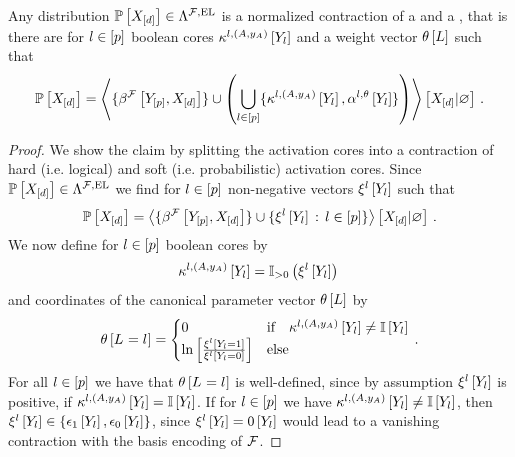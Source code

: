 \begin{theorem}
    \label{the:hybridNetworkRepresentation}
    Any distribution $\mathbb{P}\left[X_{[d]}\right]\in\Lambda^{\mathcal{F},\mathrm{EL}}$ is a normalized contraction of a \HardLogicNetwork{} and a \MarkovLogicNetwork{}, that is there are for $l\in[p]$ boolean cores $\kappa^{l,(A,y_{A})}\left[Y_{l}\right]$ and a weight vector $\theta\left[L\right]$ such that
    \begin{align*}
        \mathbb{P}\left[X_{[d]}\right] =
        \left\langle 
            \{\beta^{\mathcal{F}}\left[Y_{[p]},X_{[d]}\right]\}
            \cup \left(\bigcup_{l\in[p]}\{\kappa^{l,(A,y_{A})}\left[Y_{l}\right],\alpha^{l,\theta}\left[Y_{l}\right]\}\right)
        \right\rangle \left[ X_{[d]} | \varnothing \right] \, .
    \end{align*}
\end{theorem}
\begin{proof}
    We show the claim by splitting the activation cores into a contraction of hard (i.e. logical) and soft (i.e. probabilistic) activation cores.
    Since $\mathbb{P}\left[X_{[d]}\right]\in\Lambda^{\mathcal{F},\mathrm{EL}}$ we find for $l\in[p]$ non-negative vectors $\xi^{l}\left[Y_{l}\right]$ such that
    \begin{align*}
        \mathbb{P}\left[X_{[d]}\right] =
        \left\langle 
            \{\beta^{\mathcal{F}}\left[Y_{[p]},X_{[d]}\right]\}
            \cup \{\xi^{l}\left[Y_{l}\right]\,:\,l\in[p]\}
        \right\rangle \left[ X_{[d]} | \varnothing \right] \, .
    \end{align*}
    We now define for $l\in[p]$ boolean cores by
    \begin{align*}
        \kappa^{l,(A,y_{A})}\left[Y_{l}\right] =
        \mathbb{I}_{>0}\left(\xi^{l}\left[Y_{l}\right]\right) \,
    \end{align*}
    and coordinates of the canonical parameter vector $\theta\left[L\right]$ by
    \begin{align*}
        \theta\left[L_{}=l_{}\right] =
        \begin{cases}
            0 & \text{if}\quad \kappa^{l,(A,y_{A})}\left[Y_{l}\right]\neq\mathbb{I}\left[Y_{l}\right] \\
            \ln \left[ \frac{\xi^{l}\left[Y_{l}=1\right]}{\xi^{l}\left[Y_{l}=0\right]} \right] & \text{else} \\
        \end{cases} \, .
    \end{align*}
    For all $l\in[p]$ we have that $\theta\left[L_{}=l_{}\right]$ is well-defined, since by assumption $\xi^{l}\left[Y_{l}\right]$ is positive, if $\kappa^{l,(A,y_{A})}\left[Y_{l}\right]=\mathbb{I}\left[Y_{l}\right]$.
    If for $l\in[p]$ we have $\kappa^{l,(A,y_{A})}\left[Y_{l}\right]\neq\mathbb{I}\left[Y_{l}\right]$, then $\xi^{l}\left[Y_{l}\right]\in\{\epsilon_{1}\left[Y_{l}\right],\epsilon_{0}\left[Y_{l}\right]\}$, since $\xi^{l}\left[Y_{l}\right]=0\left[Y_{l}\right]$ would lead to a vanishing contraction with the basis encoding of $\mathcal{F}$.

\end{proof}
